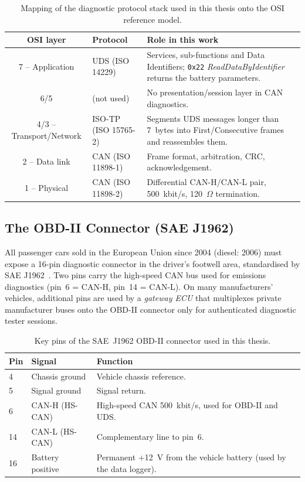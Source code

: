 \documentclass[11pt,a4paper,oneside,parskip=half]{scrreprt}
\providecommand{\hex}{}\renewcommand{\hex}[1]{\texttt{0x#1}}
\begin{document}
\begin{table}[H]
\caption{Mapping of the diagnostic protocol stack used in this thesis onto the OSI reference model.}
\label{tab:osi_stack}
\centering
\begin{tabular}{clp{6.6cm}}
\toprule
\textbf{OSI layer} & \textbf{Protocol} & \textbf{Role in this work} \\
\midrule
7 -- Application & UDS (ISO 14229)        & Services, sub-functions and Data Identifiers; \hex{22} \textit{ReadDataByIdentifier} returns the battery parameters. \\
6/5             & (not used)              & No presentation/session layer in CAN diagnostics. \\
4/3 -- Transport/Network & ISO-TP (ISO 15765-2) & Segments UDS messages longer than 7~bytes into First/Consecutive frames and reassembles them. \\
2 -- Data link  & CAN (ISO 11898-1)       & Frame format, arbitration, CRC, acknowledgement. \\
1 -- Physical   & CAN (ISO 11898-2)       & Differential CAN-H/CAN-L pair, 500~kbit/s, 120~$\Omega$ termination. \\
\bottomrule
\end{tabular}
\end{table}

\subsection{The OBD-II Connector (SAE J1962)}
All passenger cars sold in the European Union since 2004 (diesel: 2006) must expose a 16-pin diagnostic connector in the driver's footwell area, standardised by SAE J1962~\cite{saej1962}. Two pins carry the high-speed CAN bus used for emissions diagnostics (pin~6 = CAN-H, pin~14 = CAN-L). On many manufacturers' vehicles, additional pins are used by a \textit{gateway ECU} that multiplexes private manufacturer buses onto the OBD-II connector only for authenticated diagnostic tester sessions.

\begin{table}[H]
\caption{Key pins of the SAE~J1962 OBD-II connector used in this thesis.}
\label{tab:obd2_pins}
\centering
\begin{tabular}{llp{7cm}}
\toprule
\textbf{Pin} & \textbf{Signal} & \textbf{Function} \\
\midrule
4  & Chassis ground           & Vehicle chassis reference. \\
5  & Signal ground            & Signal return. \\
6  & CAN-H (HS-CAN)           & High-speed CAN 500~kbit/s, used for OBD-II and UDS. \\
14 & CAN-L (HS-CAN)           & Complementary line to pin~6. \\
16 & Battery positive         & Permanent +12~V from the vehicle battery (used by the data logger). \\
\bottomrule
\end{tabular}
\end{table}
\end{document}
